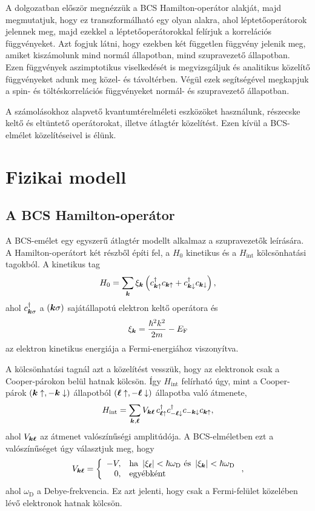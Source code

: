 \documentclass[a4paper,12pt,titlepage]{article}
\newcommand{\KK}{{\vb*{k}}}
\newcommand{\LL}{{\vb*{\ell}}}
\newcommand{\EF}{{E_\text{F}}}
\begin{document}
A dolgozatban először megnézzük a BCS Hamilton-operátor alakját, majd megmutatjuk, hogy ez transzformálható egy olyan alakra, ahol léptetőoperátorok jelennek meg, majd ezekkel a léptetőoperátorokkal felírjuk a korrelációs függvényeket.  Azt fogjuk látni, hogy ezekben két független függvény jelenik meg, amiket kiszámolunk mind normál állapotban, mind szupravezető állapotban.  Ezen függvények aszimptotikus viselkedését is megvizsgáljuk és analitikus közelítő függvényeket adunk meg közel- és távoltérben.  Végül ezek segítségével megkapjuk a spin- és töltéskorrelációs függvényeket normál- és szupravezető állapotban.

A számolásokhoz alapvető kvantumtérelméleti eszközöket használunk, részecske keltő és eltüntető operátorokat, illetve átlagtér közelítést.  Ezen kívül a BCS-elmélet közelítéseivel is élünk.



\section{Fizikai modell}

\subsection{A BCS Hamilton-operátor}

A BCS-emélet egy egyszerű átlagtér modellt alkalmaz a szupravezetők leírására.  A Hamilton-operátort két részből építi fel, a $H_0$ kinetikus és a $H_\text{int}$ kölcsönhatási tagokból.  A kinetikus tag
\begin{equation}
	H_0 = \sum\limits_\KK \xi_\KK \left( c_{\KK \uparrow}^\dagger c_{\KK \uparrow} + c_{\KK \downarrow}^\dagger c_{\KK \downarrow} \right),
\end{equation}
ahol $c_{\KK \sigma}^\dagger$ a $\left( \KK \sigma \right)$ sajátállapotú elektron keltő operátora és
$$ \xi_\KK = \frac{\hbar^2 k^2}{2 m} - \EF $$
az elektron kinetikus energiája a Fermi-energiához viszonyítva.

A kölcsönhatási tagnál azt a közelítést vesszük, hogy az elektronok csak a Cooper-párokon belül hatnak kölcsön.  Így $H_\text{int}$ felírható úgy, mint a Cooper-párok $\left( \KK \uparrow, -\KK \downarrow \right)$ állapotból $\left( \LL \uparrow, -\LL \downarrow \right)$ állapotba való átmenete,
\begin{equation} \label{H-int-def}
	H_\text{int} = \sum\limits_{\KK, \LL} V_{\KK \LL} \, c_{\LL \uparrow}^\dagger c_{-\LL \downarrow}^\dagger c_{-\KK \downarrow} c_{\KK \uparrow},
\end{equation}
ahol $V_{\KK \LL}$ az átmenet valószínűségi amplitúdója.  A BCS-elméletben ezt a valószínűséget úgy választjuk meg, hogy
$$ V_{\KK \LL} = \left\{ \begin{array}{rl}
	-V, & \text{ha } \left| \xi_\LL \right| < \hbar \omega_\text{D} \text{ és } \left| \xi_\KK \right| < \hbar \omega_\text{D} \\
	0, & \text{egyébként}
\end{array} \right. , $$
ahol $\omega_\text{D}$ a Debye-frekvencia.  Ez azt jelenti, hogy csak a Fermi-felület közelében lévő elektronok hatnak kölcsön.
\end{document}

